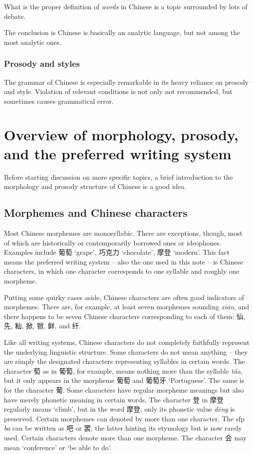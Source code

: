 \documentclass[UTF8, a4paper, oneside, scheme=plain]{ctexart}
\newcommand*{\term}[1]{\emph{#1}}
\newcommand{\corpus}[1]{\emph{#1}}
\newcommand{\translate}[1]{`#1'}
\begin{document}
What is the proper definition of \term{words} in Chinese 
is a topic surrounded by lots of debate. %

The conclusion is Chinese is basically an analytic language,
but not among the most analytic ones.

\subsubsection{Prosody and styles}

The grammar of Chinese is especially remarkable in its heavy reliance on prosody and style.
Violation of relevant conditions is not only not recommended,
but sometimes causes grammatical error.

\section{Overview of morphology, prosody, and the preferred writing system}

Before starting discussion on more specific topics, 
a brief introduction to the morphology and prosody structure of Chinese is a good idea.

\subsection{Morphemes and Chinese characters}

Most Chinese morphemes are monosyllabic. 
There are exceptions, though, most of which are historically or contemporarily borrowed ones
or ideophones.
Examples include 
葡萄 \translate{grape},
巧克力 \translate{chocolate},
摩登 \translate{modern}.
This fact means the preferred writing system -- also the one used in this note --
is Chinese characters,
in which one character corresponds to one syllable
and roughly one morpheme.

Putting some quirky cases aside,
Chinese characters are often good indicators of morphemes.
There are, for example, at least seven morphemes sounding \corpus{xi\={a}n},
and there happens to be seven Chinese characters corresponding to each of them:
仙, 先, 籼, 掀, 锨, 鲜, and 纤.

Like all writing systems, 
Chinese characters do not completely faithfully represent 
the underlying linguistic structure.
Some characters do not mean anything -- 
they are simply the designated characters representing syllables in certain words.
The character 萄 as in 葡萄, for example, 
means nothing more than the syllable \corpus{t\'{a}o},
but it only appears in the morpheme 葡萄 and 葡萄牙 \translate{Portuguese}.
The same is for the character 葡.
Some characters have regular morpheme meanings
but also have merely phonetic meaning in certain words.
The character 登 in 摩登 regularly means \translate{climb},
but in the word 摩登, only its phonetic value \corpus{d\={e}ng} is preserved.
Certain morphemes can denoted by more than one character.
The \ac{sfp} \corpus{ba} can be written as 吧 or 罢,
the latter hinting its etymology but is now rarely used.
Certain characters denote more than one morpheme.
The character 会 may mean \translate{conference} or \translate{be able to do}. 
\end{document}
